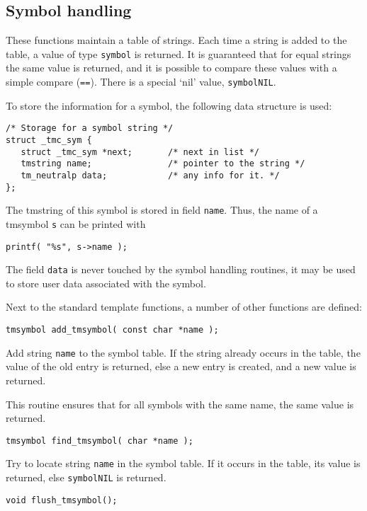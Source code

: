 \subsection{Symbol handling}
\label{s.tmsymbol}
These functions maintain a table of strings.
Each time a string is added to the table,
a value of type {\tt symbol} is returned.
It is guaranteed that for equal strings the same value is returned,
and it is possible to compare these values with a simple compare ({\tt ==}).
There is a special `nil' value, {\tt symbolNIL}.
\par
To store the information for a symbol, the following data structure is used:
\begin{verbatim}
/* Storage for a symbol string */
struct _tmc_sym {
   struct _tmc_sym *next;       /* next in list */
   tmstring name;               /* pointer to the string */
   tm_neutralp data;            /* any info for it. */
};
\end{verbatim}
The tmstring of this symbol is stored in field \verb+name+.
Thus,
the name of a tmsymbol \verb+s+ can be printed with
\begin{verbatim}
printf( "%s", s->name );
\end{verbatim}
The field \verb+data+ is never touched by the symbol handling routines,
it may be used to store user data associated with the symbol.
\par
Next to the standard template functions, a number of other functions
are defined:
\begin{verbatim}
tmsymbol add_tmsymbol( const char *name );
\end{verbatim}
\begin{desc}
Add string {\tt name} to the symbol table.
If the string already occurs in the table, the value of the old
entry is returned, else a new entry is created,
and a new value is returned.
\par
This routine ensures that for all symbols with the same name,
the same value is returned.
\end{desc}
\begin{verbatim}
tmsymbol find_tmsymbol( char *name );
\end{verbatim}
\begin{desc}
Try to locate string {\tt name} in the symbol table.
If it occurs in the table, its value is returned,
else {\tt symbolNIL} is returned.
\end{desc}
\begin{verbatim}
void flush_tmsymbol();
\end{verbatim}
